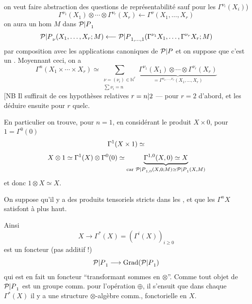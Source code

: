 on veut faire abstraction des questions de représentabilité sauf pour les $\Gamma^{\nu_i}(X_i)$)
\[\Gamma^{\nu_1}(X_1)\otimes\cdots\otimes\Gamma^{\nu_r}(X_r)\longleftarrow\Gamma^\nu(X_1,\ldots,X_r)\]
on aura un hom  $M$ dans ${\mathcal P|P}_1$
\[{\mathcal P|P}_\nu(X_1,\ldots,X_r;M)\longleftarrow {\mathcal P|P}_{1,\ldots,1}(\Gamma^{\nu_1}X_1,\ldots,\Gamma^{\nu_r}X_r;M)\]
par composition avec les applications canoniques de ${\mathcal P|P}$
et on suppose que c'est un . Moyennant ceci, on a
\[\Gamma^n(X_1\times\cdots\times X_r)\simeq\sum_{\substack{\nu=(\nu_i)\in\mathbb N^r\\\sum\nu_i=n}}\underbrace{\Gamma^{\nu_1}(X_1)\otimes\cdots\otimes\Gamma^{\nu_r}(X_r)}_{=\Gamma^{\nu_1,\ldots,\nu_r}(X_1,\ldots,X_r)}\]
[NB Il suffirait de  ces hypothèses relatives $r={n|2}$ --- pour $r=2$ d'abord, et les déduire ensuite pour $r$ quelc.

En particulier on trouve, pour $n=1$, en considérant le produit $X\times0$, pour $1=\Gamma^0(0)$
\[\Gamma^1(X\times1)\simeq\]
\[X\otimes1\simeq\Gamma^1(X)\otimes\Gamma^0(0)\simeq\underbrace{\Gamma^{1,0}(X,0)\simeq X}_{\text{car }{\mathcal P|P}_{1,0}(X,0;M)\simeq {\mathcal P|P}_1(X,M)}\]
et donc $1\otimes X\simeq X$.  

On suppose qu'il y a des produits tensoriels stricts dans les , et que les $\Gamma^nX$ satisfont à  plus haut.

Ainsi
\[X\longrightarrow\Gamma^*(X)=(\Gamma^i(X))_{i\geq0}\]
est un foncteur (pas  additif !)
\[{\mathcal P|P}_1\longrightarrow\operatorname{Grad}({\mathcal P|P}_1)\]
qui est en fait un foncteur ``transformant sommes en $\otimes$''. Comme tout objet de ${\mathcal P|P}_1$ est un  groupe comm. pour l'opération $\oplus$, il s'ensuit que dans chaque $\Gamma^*(X)$ il y a une structure $\otimes$-algèbre  comm., fonctorielle en $X$.

